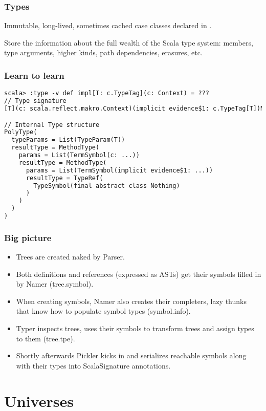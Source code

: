 \documentclass[hyperref={bookmarks=false}]{beamer}
\begin{document}
\begin{frame}[fragile]
\frametitle{Types}

Immutable, long-lived, sometimes cached case classes declared in .

Store the information about the full wealth of the Scala type system:
members, type arguments, higher kinds, path dependencies, erasures, etc.

\end{frame}

\begin{frame}[fragile]
\frametitle{Learn to learn}

\begin{lstlisting}[language=XML]
scala> :type -v def impl[T: c.TypeTag](c: Context) = ???
// Type signature
[T](c: scala.reflect.makro.Context)(implicit evidence$1: c.TypeTag[T])Nothing

// Internal Type structure
PolyType(
  typeParams = List(TypeParam(T))
  resultType = MethodType(
    params = List(TermSymbol(c: ...))
    resultType = MethodType(
      params = List(TermSymbol(implicit evidence$1: ...))
      resultType = TypeRef(
        TypeSymbol(final abstract class Nothing)
      )
    )
  )
)
\end{lstlisting}
\end{frame}

\begin{frame}[fragile]
\frametitle{Big picture}

\begin{itemize}
\item Trees are created naked by Parser.
\item Both definitions and references (expressed as ASTs) get their symbols filled in by Namer (tree.symbol).
\item When creating symbols, Namer also creates their completers, lazy thunks that know how to populate symbol types (symbol.info).
\item Typer inspects trees, uses their symbols to transform trees and assign types to them (tree.tpe).
\item Shortly afterwards Pickler kicks in and serializes reachable symbols along with their types into ScalaSignature annotations.
\end{itemize}
\end{frame}

\section{Universes}
\end{document}
